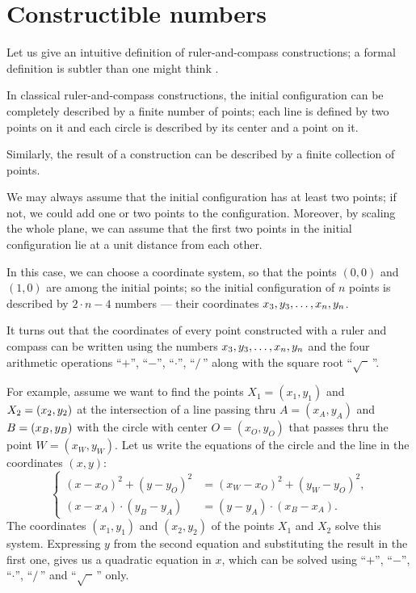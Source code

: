 %

\section{Constructible numbers}

Let us give an intuitive definition of ruler-and-compass constructions; a formal definition is subtler than one might think \cite{engeler}.

In classical ruler-and-compass constructions, the initial configuration can be completely described by a finite number of points;
each line is defined by two points on it and each circle is described by its center and a point on it.

Similarly, the result of a construction can be described by a finite collection of points.

We may always assume that the initial configuration has at least two points;
if not, we could add one or two points to the configuration.
Moreover, by scaling the whole plane, we can assume that the first two points in the initial configuration lie at a unit distance from each other.

In this case, we can choose a  coordinate system, 
so that the points $(0,0)$ and $(1,0)$ are among the initial points;
so the initial configuration of $n$ points is described by 
$2\cdot n-4$ numbers --- their coordinates $x_3,y_3,\z\dots,x_n,y_n$. 

\medskip

It turns out that the coordinates of every point constructed with a ruler and compass
can be written using the numbers $x_3,y_3,\z\dots,x_n,y_n$ and the four arithmetic operations ``$+$'', ``$-$'', ``$\cdot$'', ``$/\,$''
along with the square root ``$\sqrt{\phantom{a}}\,$''.

For example, assume we want to find the points $X_1=(x_1,y_1)$ and $X_2\z=(x_2,y_2)$ at the intersection of
a line passing thru $A=(x_A,y_A)$ and $B\z=(x_B,y_B)$
with the circle with center $O=(x_O,y_O)$ that passes thru the point $W=(x_W,y_W)$.
Let us write the equations of the circle and the line in the coordinates $(x,y)$:
$$
\left\{
\begin{aligned}
(x-x_O)^2+(y-y_O)^2&=(x_W-x_O)^2+(y_W-y_O)^2,
\\
(x-x_A)\cdot(y_B-y_A)&=(y-y_A)\cdot(x_B-x_A).
\end{aligned}
\right.
$$
The coordinates $(x_1,y_1)$ and $(x_2,y_2)$ of the points $X_1$ and $X_2$ solve this system.
Expressing $y$ from the second equation and substituting the result in the first one, gives us a quadratic equation in $x$, 
which can be solved using ``$+$'', ``$-$'', ``$\cdot$'', ``$/\,$''
and  ``$\sqrt{\phantom{a}}\,$'' only.


